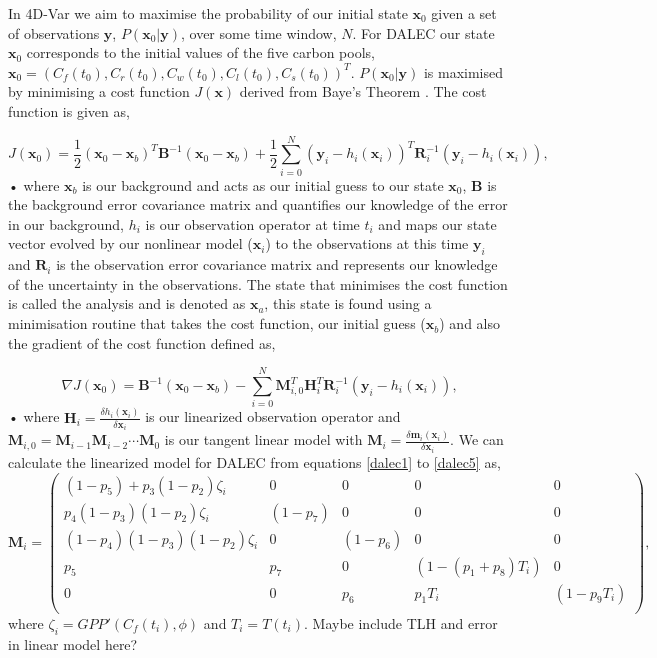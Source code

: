 \documentclass[11pt]{article}
\begin{document}
In 4D-Var we aim to maximise the probability of our initial state $\textbf{x}_0$ given a set of observations $\textbf{y}$, $P(\textbf{x}_0|\textbf{y})$, over some time window, $N$. For DALEC our state $\textbf{x}_0$ corresponds to the initial values of the five carbon pools,  $\textbf{x}_0 = (C_f(t_0), C_r(t_0), C_w(t_0), C_l(t_0), C_s(t_0))^T$. $P(\textbf{x}_0|\textbf{y})$ is maximised by minimising a cost function $J(\textbf{x})$ derived from Baye's Theorem \cite{lewis2006dynamic}. The cost function is given as,

\begin{equation}
J(\textbf{x}_0) = \frac{1}{2}(\textbf{x}_0-\textbf{x}_b)^{T}\textbf{B}^{-1}(\textbf{x}_0-\textbf{x}_b)+\frac{1}{2}\sum_{i=0}^{N}(\textbf{y}_i-h_i(\textbf{x}_i))^{T}\textbf{R}_{i}^{-1}(\textbf{y}_i-h_i(\textbf{x}_i)),
\end{equation}•
where $\textbf{x}_b$ is our background and acts as our initial guess to our state $\textbf{x}_0$, $\textbf{B}$ is the background error covariance matrix and quantifies our knowledge of the error in our background, $h_i$ is our observation operator at time $t_i$ and maps our state vector evolved by our nonlinear model ($\textbf{x}_i$) to the observations at this time $\textbf{y}_i$ and $\textbf{R}_i$ is the observation error covariance matrix and represents our knowledge of the uncertainty in the observations. The state that minimises the cost function is called the analysis and is denoted as $\textbf{x}_a$, this state is found using a minimisation routine that takes the cost function, our initial guess ($\textbf{x}_b$) and also the gradient of the cost function defined as,

\begin{equation}
\nabla J(\textbf{x}_0) = \textbf{B}^{-1}(\textbf{x}_0-\textbf{x}_b)-\sum_{i=0}^{N}\textbf{M}_{i,0}^{T}\textbf{H}_i^{T}\textbf{R}_{i}^{-1}(\textbf{y}_i-h_i(\textbf{x}_i)),
\end{equation}•
where $\textbf{H}_i = \frac{\delta h_i(\textbf{x}_i)}{\delta\textbf{x}_i}$ is our linearized observation operator and $\mathbf{M}_{i,0}=\mathbf{M}_{i-1}\mathbf{M}_{i-2}\cdots\mathbf{M}_0$ is our tangent linear model with $\mathbf{M}_i=\frac{\delta \textbf{m}_i(\textbf{x}_i)}{\delta \textbf{x}_i}$. We can calculate the linearized model for DALEC from equations \ref{dalec1} to \ref{dalec5} as,
\begin{equation}
\mathbf{M}_{i}= 
\begin{pmatrix} 
(1-p_5)+p_3(1-p_2)\zeta_i & 0 & 0 & 0 & 0 \\
p_4(1-p_3)(1-p_2)\zeta_i & (1-p_7) & 0 & 0 & 0 \\
(1-p_4)(1-p_3)(1-p_2)\zeta_i & 0 & (1-p_6) & 0 & 0 \\
p_5 & p_7 & 0 & (1-(p_1+p_8)T_i) & 0 \\
0 & 0 & p_6 & p_1T_i & (1-p_9T_i) \\
\end{pmatrix}, \label{linmod}
\end{equation}
where $\zeta_i = GPP'(C_f(t_i), \phi)$ and $T_{i}=T(t_i)$. {\color{red} Maybe include TLH and error in linear model here?}
\end{document}
